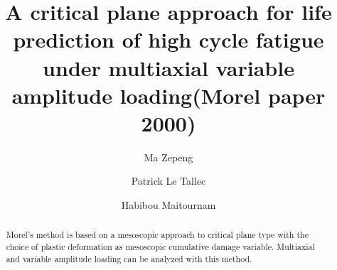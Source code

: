 \documentclass[3p,times,procedia,number]{elsarticle}
\begin{document}
\begin{frontmatter}




\title{A critical plane approach for life prediction of high cycle fatigue
	under multiaxial variable amplitude loading(Morel paper 2000)}




\author[a]{Ma Zepeng}
\author[b]{Patrick Le Tallec}
\author[c]{Habibou Maitournam}

\address[a]{Laboratory of Solid Mechanics, Ecole Polytechnique, 91128 Palaiseau Cedex, France}
\address[b]{Laboratory of Solid Mechanics, Ecole Polytechnique, 91128 Palaiseau Cedex, France}
\address[c]{ IMSIA, ENSTA ParisTech, CNRS, CEA, EDF, Université Paris-Saclay, 828 bd des Maréchaux, 91762 Palaiseau cedex France}

\begin{abstract}
Morel's method is based on a mesoscopic approach to critical plane type with the
choice of plastic deformation as mesoscopic cumulative damage variable.  Multiaxial and variable amplitude loading can be analyzed with this method.
 
\end{abstract}


\end{frontmatter}
\end{document}
